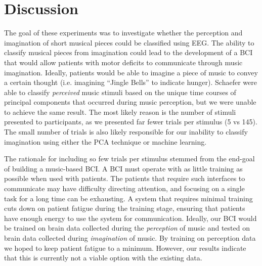 \chapter{Discussion}
The goal of these experiments was to investigate whether the perception and imagination of short musical pieces could be classified using EEG.  
The ability to classify musical pieces from imagination could lead to the development of a \ac{BCI} that would allow patients with motor deficits to communicate through music imagination.
Ideally, patients would be able to imagine a piece of music to convey a certain thought (i.e. imagining ``Jingle Bells'' to indicate hunger).
Schaefer \etal \citeyear{schaefer_name_2011} were able to classify \emph{perceived} music stimuli based on the unique time courses of principal components that occurred during music perception, but we were unable to achieve the same result. 
The most likely reason is the number of stimuli presented to participants, as we presented far fewer trials per stimulus (5 vs 145). 
The small number of trials is also likely responsible for our inability to classify imagination using either the PCA technique or machine learning. 

The rationale for including so few trials per stimulus stemmed from the end-goal of building a music-based \ac{BCI}. 
A \ac{BCI} must operate with as little training as possible when used with patients.
The patients that require such interfaces to communicate may have difficulty directing attention, and focusing on a single task for a long time can be exhausting. 
A system that requires minimal training cuts down on patient fatigue during the training stage, ensuring that patients have enough energy to use the system for communication. 
Ideally, our \ac{BCI} would be trained on brain data collected during the \emph{perception} of music and tested on brain data collected during \emph{imagination} of music. 
By training on perception data we hoped to keep patient fatigue to a minimum. 
However, our results indicate that this is currently not a viable option with the existing data.  

